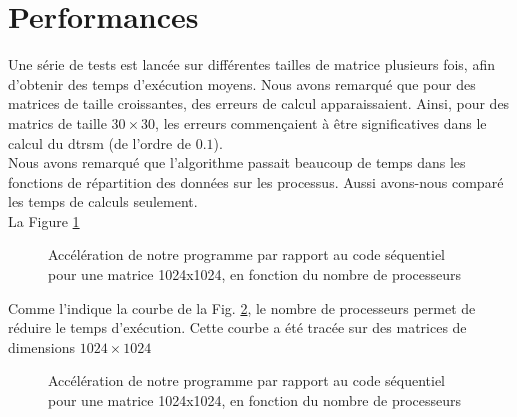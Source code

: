\section{Performances} %
\label{sec:perf}

Une série de tests est lancée sur différentes tailles de matrice plusieurs fois, afin d'obtenir des temps d'exécution moyens. Nous avons remarqué que pour des matrices de taille croissantes, des erreurs de calcul apparaissaient. Ainsi, pour des matrics de taille $30 \times 30$, les erreurs commençaient à être significatives dans le calcul du dtrsm (de l'ordre de $0.1$).\\
Nous avons remarqué que l'algorithme passait beaucoup de temps dans les fonctions de répartition des données sur les processus. Aussi avons-nous comparé les temps de calculs seulement. \\
La Figure \ref{fig:sp-size} 

\begin{figure}[H]
\centering
\caption{Accélération de notre programme par rapport au code séquentiel pour une matrice 1024x1024, en fonction du nombre de processeurs}
\label{fig:sp-size}
\end{figure}

Comme l'indique la courbe de la Fig. \ref{fig:sp-proc}, le nombre de processeurs permet de réduire le temps d'exécution. Cette courbe a été tracée sur des matrices de dimensions $1024\times1024$
\begin{figure}[H]
\centering
\caption{Accélération de notre programme par rapport au code séquentiel pour une matrice 1024x1024, en fonction du nombre de processeurs}
\label{fig:sp-proc}
\end{figure}

